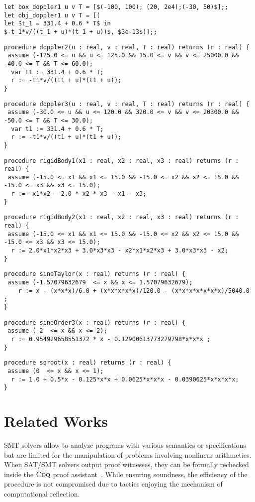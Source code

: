 \documentclass[preprint]{sigplanconf}
\newcommand{\coq}{\text{\sc Coq}}
\theoremstyle{plain}
\begin{document}
{\scriptsize
\begin{lstlisting}
let box_doppler1 u v T = [$(-100, 100); (20, 2e4);(-30, 50)$];; 
let obj_doppler1 u v T = [(
let $t_1 = 331.4 + 0.6 * T$ in 
$-t_1*v/((t_1 + u)*(t_1 + u))$, $3e-13$)];;
\end{lstlisting}
}
{\scriptsize
\begin{lstlisting}
procedure doppler2(u : real, v : real, T : real) returns (r : real) {
 assume (-125.0 <= u && u <= 125.0 && 15.0 <= v && v <= 25000.0 && -40.0 <= T && T <= 60.0);
  var t1 := 331.4 + 0.6 * T;
  r := -t1*v/((t1 + u)*(t1 + u));
}
\end{lstlisting}
}
{\scriptsize
\begin{lstlisting}
procedure doppler3(u : real, v : real, T : real) returns (r : real) {
 assume (-30.0 <= u && u <= 120.0 && 320.0 <= v && v <= 20300.0 && -50.0 <= T && T <= 30.0);
  var t1 := 331.4 + 0.6 * T;
  r := -t1*v/((t1 + u)*(t1 + u));
}
\end{lstlisting}
}
{\scriptsize
\begin{lstlisting}
procedure rigidBody1(x1 : real, x2 : real, x3 : real) returns (r : real) {
 assume (-15.0 <= x1 && x1 <= 15.0 && -15.0 <= x2 && x2 <= 15.0 && -15.0 <= x3 && x3 <= 15.0);
  r := -x1*x2 - 2.0 * x2 * x3 - x1 - x3;
}
\end{lstlisting}
}
{\scriptsize
\begin{lstlisting}
procedure rigidBody2(x1 : real, x2 : real, x3 : real) returns (r : real) {
 assume (-15.0 <= x1 && x1 <= 15.0 && -15.0 <= x2 && x2 <= 15.0 && -15.0 <= x3 && x3 <= 15.0);
  r := 2.0*x1*x2*x3 + 3.0*x3*x3 - x2*x1*x2*x3 + 3.0*x3*x3 - x2;
}
\end{lstlisting}
}
{\scriptsize
\begin{lstlisting}
procedure sineTaylor(x : real) returns (r : real) {
 assume (-1.57079632679  <= x && x <= 1.57079632679);
    r := x - (x*x*x)/6.0 + (x*x*x*x*x)/120.0 - (x*x*x*x*x*x*x)/5040.0 ;
}
\end{lstlisting}
}
{\scriptsize
\begin{lstlisting}
procedure sineOrder3(x : real) returns (r : real) {
 assume (-2  <= x && x <= 2);
  r := 0.954929658551372 * x - 0.12900613773279798*x*x*x ;
}
\end{lstlisting}
}
{\scriptsize
\begin{lstlisting}
procedure sqroot(x : real) returns (r : real) {
 assume (0  <= x && x <= 1);
  r := 1.0 + 0.5*x - 0.125*x*x + 0.0625*x*x*x - 0.0390625*x*x*x*x;
}
\end{lstlisting}
}
\section{Related Works} %
%
SMT solvers allow to analyze programs with various semantics or specifications but are limited for the manipulation of problems involving nonlinear arithmetics. When SAT/SMT solvers output proof witnesses, they can be formally rechecked inside the $\coq$ proof assistant~\cite{smtcoq}. While ensuring soundness, the efficiency of the procedure is not compromised due to tactics enjoying the mechanism of computational reflection.
\end{document}
